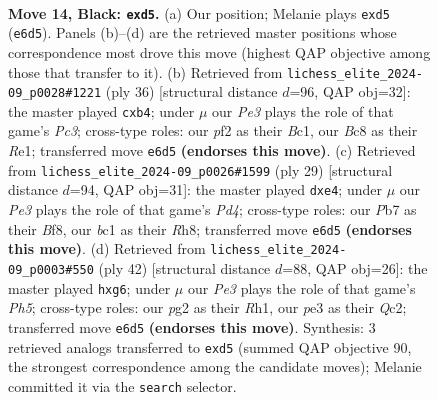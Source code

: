 \documentclass[11pt]{article}
\begin{document}
\clearpage

\begin{figure}[p]\centering
\begin{subfigure}{0.46\textwidth}\centering
\resizebox{\linewidth}{!}{%
\newchessgame
\chessboard[
  setfen={r1b1kb1r/ppq3pp/2p1p3/3BNp2/3P4/1Q2P3/PP3PPP/R1B1K2R b KQ - 0 14},
  showmover=false,
  pgfstyle=straightmove, color=movearrow, markmove={e6-d5}
]}
\caption{}
\end{subfigure}\hfill
\begin{subfigure}{0.46\textwidth}\centering
\resizebox{\linewidth}{!}{%
\newchessgame
\chessboard[
  setfen={r2qk2r/1p2bpp1/p2pp3/4n1p1/1p2P1P1/2PP2QP/P4PB1/R1B1R1K1 w kq - 0 19},
  showmover=false,
  pgfstyle=straightmove, color=movearrow, markmove={c3-b4}
]}
\caption{}
\end{subfigure}
\\[4pt]
\begin{subfigure}{0.46\textwidth}\centering
\resizebox{\linewidth}{!}{%
\newchessgame
\chessboard[
  setfen={r3kb1r/1p1qppp1/p6p/3pP3/4NB2/1Q2P3/PP3PPP/R3K2R b KQkq - 0 15},
  showmover=false,
  pgfstyle=straightmove, color=movearrow, markmove={d5-e4}
]}
\caption{}
\end{subfigure}\hfill
\begin{subfigure}{0.46\textwidth}\centering
\resizebox{\linewidth}{!}{%
\newchessgame
\chessboard[
  setfen={2b1r1k1/pp2q2p/1n1b2p1/3Ppp1P/2B5/P3P3/1PQB1PP1/R3K2R w KQ - 1 22},
  showmover=false,
  pgfstyle=straightmove, color=movearrow, markmove={h5-g6}
]}
\caption{}
\end{subfigure}
\caption{\textbf{Move 14, Black: \texttt{exd5}.} (a) Our position; Melanie plays \texttt{exd5} (\texttt{e6d5}). Panels (b)--(d) are the retrieved master positions whose correspondence most drove this move (highest QAP objective among those that transfer to it). (b) Retrieved from \texttt{lichess\_elite\_2024-09\_p0028\#1221} (ply 36) [structural distance $d$=96, QAP obj=32]: the master played \texttt{cxb4}; under $\mu$ our \emph{Pe3} plays the role of that game's \emph{Pc3}; cross-type roles: our \emph{p}f2 as their \emph{B}c1, our \emph{B}c8 as their \emph{R}e1; transferred move \texttt{e6d5} \textbf{(endorses this move)}. (c) Retrieved from \texttt{lichess\_elite\_2024-09\_p0026\#1599} (ply 29) [structural distance $d$=94, QAP obj=31]: the master played \texttt{dxe4}; under $\mu$ our \emph{Pe3} plays the role of that game's \emph{Pd4}; cross-type roles: our \emph{P}b7 as their \emph{B}f8, our \emph{b}c1 as their \emph{R}h8; transferred move \texttt{e6d5} \textbf{(endorses this move)}. (d) Retrieved from \texttt{lichess\_elite\_2024-09\_p0003\#550} (ply 42) [structural distance $d$=88, QAP obj=26]: the master played \texttt{hxg6}; under $\mu$ our \emph{Pe3} plays the role of that game's \emph{Ph5}; cross-type roles: our \emph{p}g2 as their \emph{R}h1, our \emph{p}e3 as their \emph{Q}c2; transferred move \texttt{e6d5} \textbf{(endorses this move)}. Synthesis: 3 retrieved analogs transferred to \texttt{exd5} (summed QAP objective 90, the strongest correspondence among the candidate moves); Melanie committed it via the \texttt{search} selector.}
\label{fig:thought-m27}
\end{figure}
\end{document}
